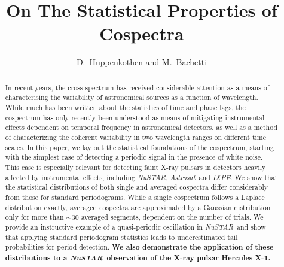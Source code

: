 \documentclass[12pt]{emulateapj}
\newcommand{\project}[1]{\textsl{#1}}
\newcommand{\nustar}{\project{NuSTAR}\xspace}
\newcommand{\astrosat}{\project{Astrosat}\xspace}
\newcommand{\ixpe}{\project{IXPE}\xspace}
\begin{document}
\title[On The Statistical Properties of Cospectra]{On The Statistical Properties of Cospectra}

\author{D.~Huppenkothen and M.~Bachetti}



\begin{abstract}
In recent years, the cross spectrum has received considerable attention as a means of characterising the variability of astronomical sources as a function of wavelength. While much has been written about the statistics of time and phase lags, the cospectrum has only recently been understood as means of mitigating instrumental effects dependent on temporal frequency in astronomical detectors, as well as a method of characterizing the coherent variability in two  wavelength ranges on different time scales. In this paper, we lay out the statistical foundations of the cospectrum, starting with the simplest case of detecting a periodic signal in the presence of white noise. This case is especially relevant for detecting faint X-ray pulsars in detectors heavily affected by instrumental effects, including \nustar, \astrosat\ and \ixpe. We show that the statistical distributions of both single and averaged cospectra differ considerably from those for standard periodograms. While a single cospectrum follows a Laplace distribution exactly, averaged cospectra are approximated by a Gaussian distribution only for more than $\sim\!\! 30$ averaged segments, dependent on the number of trials. We provide an instructive example of a quasi-periodic oscillation in \nustar\ and show that applying standard periodogram statistics leads to underestimated tail probabilities for period detection. \textbf{We also demonstrate the application of these distributions to a \nustar\ observation of the X-ray pulsar Hercules X-1.}

\end{abstract}
\end{document}

